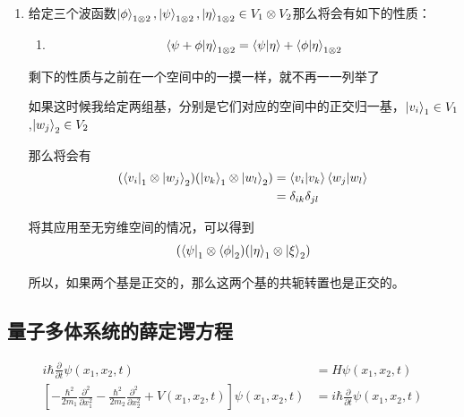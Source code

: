 \documentclass{article}
\newcommand{\pmtwo}[4]{\begin{pmatrix}#1&#2\\#3&#4\end{pmatrix}}
\newcommand{\pmthree}[9]{
    \begin{pmatrix}
        #1&#2&#3\\
        #4&#5&#6\\
        #7&#8&#9
    \end{pmatrix}
}
\begin{document}
\begin{enumerate}
\begin{align*}
\begin{pmatrix}
		      \end{pmatrix}
	      \end{align*}
	      另外还有一个例子，
	      \begin{align*}
		      A=\pmtwo{A_{11}}{A_{12}}{A_{21}}{A_{22}}\in V_1,
		      B=\pmthree{B_{11}}{B_{12}}{B_{13}}{B_{21}}{B_{22}}{B_{23}}{B_{31}}{B_{32}}{B_{33}}\in V_2
	      \end{align*}
	      他们的张量积为
	      \begin{align*}
		      A\otimes B=
		      \begin{pmatrix}
			      A_{11}B & A_{12}B \\
			      A_{21}B & A_{22}B
		      \end{pmatrix}
	      \end{align*}
	\item 给定三个波函数$\displaystyle\ket{\phi}_{1\otimes 2},\ket{\psi}_{1\otimes 2},\ket{\eta}_{1\otimes 2}\in V_1\otimes V_2$那么将会有如下的性质：
	      \begin{enumerate}
		      \item \[\braket{\psi+\phi}{\eta}_{1\otimes2}=\braket{\psi}{\eta}+\braket{\phi}{\eta}_{1\otimes2}\]
	      \end{enumerate}
	      剩下的性质与之前在一个空间中的一摸一样，就不再一一列举了

	      如果这时候我给定两组基，分别是它们对应的空间中的正交归一基，$\ket{v_i}_1\in V_1$,$\ket{w_j}_2 \in V_2$

	      那么将会有
	      \begin{align*}
		      (\bra{v_i}_1\otimes\ket{w_j}_2)(\ket{v_k}_1\otimes\ket{w_l}_2) & =\braket{v_i}{v_k}\braket{w_j}{w_l} \\
		                                                                     & =\delta_{ik}\delta_{jl}
	      \end{align*}

	      将其应用至无穷维空间的情况，可以得到
	      \begin{align*}
		      (\bra{\psi}_1\otimes \bra{\phi}_2)(\ket{\eta}_1\otimes \ket{\xi}_2)
	      \end{align*}

	      所以，如果两个基是正交的，那么这两个基的共轭转置也是正交的。
\end{enumerate}


\subsection{量子多体系统的薛定谔方程}
\begin{align*}
	i\hbar\frac{\partial}{\partial t}\psi(x_1,x_2,t)                                                                                                      & = H\psi(x_1,x_2,t)                                 \\
	\left[-\frac{\hbar^2}{2m_1}\frac{\partial^2}{\partial x_1^2}-\frac{\hbar^2}{2m_2}\frac{\partial^2}{\partial x_2^2}+V(x_1,x_2,t)\right]\psi(x_1,x_2,t) & = i\hbar\frac{\partial}{\partial t}\psi(x_1,x_2,t)
\end{align*}
\end{document}
